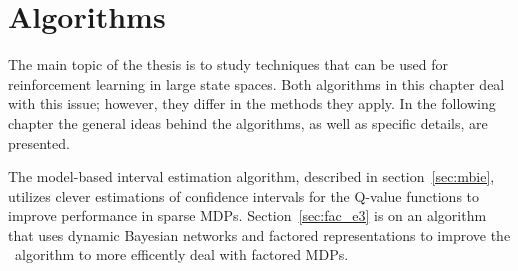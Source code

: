 \chapter{Algorithms}
\label{ch:algo}

The main topic of the thesis is to study techniques that can be used for
reinforcement learning in large state spaces. Both algorithms in this chapter deal with this
issue; however, they differ in the methods they apply. In the following chapter
the general ideas behind the algorithms, as well as specific details, are
presented. 

The model-based interval estimation algorithm, described in
section~\ref{sec:mbie}, utilizes clever estimations of confidence intervals for
the Q-value functions to improve performance in sparse MDPs.
Section~\ref{sec:fac_e3} is on an algorithm that uses dynamic Bayesian networks
and factored representations to improve the \etre\ algorithm to more efficently
deal with factored MDPs. 




